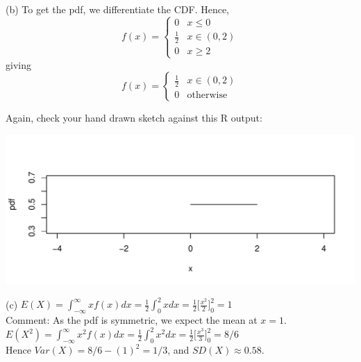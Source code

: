 \documentclass[bigtut]{tutorial}\usepackage[]{graphicx}\usepackage[]{color}
\makeatletter
\def\maxwidth{ %
  \ifdim\Gin@nat@width>\linewidth
    \linewidth
  \else
    \Gin@nat@width
  \fi
}
\newenvironment{knitrout}{}{} %
\makeatother
\begin{document}
\begin{tutorial}
\begin{questions}
\begin{solution}
(b) 
To get the pdf, we differentiate the CDF. Hence,
\[ f(x) =      \left\{     \begin{array}{ll} 0        & x \leq 0  \\
                                                         \frac{1}{2}     & x \in (0,2)  \\
                                                         0        & x \geq 2 
  		      \end{array}    \right.  \]
giving
\[ f(x) =      \left\{     \begin{array}{ll}                                                      \frac{1}{2}     & x \in (0,2)  \\
                                                         0        & \text{otherwise} 
    	      \end{array}    \right.  \]

Again, check your hand drawn sketch against this R output:

\begin{knitrout}
\color{fgcolor}
\includegraphics[width=\maxwidth]{figure/unnamed-chunk-22-1} 

\end{knitrout}


(c)
$E(X) = \int_{-\infty}^{\infty} x f(x) dx = \frac{1}{2} \int_{0}^{2}x dx = \frac{1}{2} \big[ \frac{x^2}{2} \big]_{0}^{2}  = 1$\\

Comment: As the pdf is symmetric, we expect the mean at $x=1$. \\

$E(X^2) = \int_{-\infty}^{\infty} x^2 f(x) dx = \frac{1}{2} \int_{0}^{2}x^2 dx = \frac{1}{2} \big[ \frac{x^3}{3} \big]_{0}^{2}  = 8/6$\\

Hence $Var(X) = 8/6 - (1)^2 = 1/3$, and $SD(X) \approx 0.58$.  \\


\end{solution}
\end{questions}
\end{tutorial}
\end{document}
